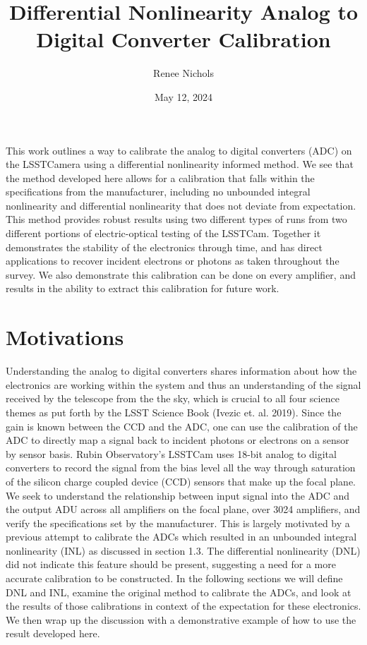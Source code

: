 \documentclass[11pt, letterpaper]{article}
\title{Differential Nonlinearity Analog to Digital Converter Calibration}
\author{Renee Nichols}
\date{May 12, 2024}
\begin{document}
\maketitle 

This work outlines a way to calibrate the analog to digital converters (ADC) on the LSSTCamera using a differential nonlinearity informed method. 
We see that the method developed here allows for a calibration that falls within the specifications from the manufacturer, including no unbounded integral nonlinearity and differential nonlinearity that does not deviate from expectation. 
This method provides robust results using two different types of runs from two different portions of electric-optical testing of the LSSTCam. 
Together it demonstrates the stability of the electronics through time, and has direct applications to recover incident electrons or photons as taken throughout the survey. 
We also demonstrate this calibration can be done on every amplifier, and results in the ability to extract this calibration for future work. 

\section{Motivations}
\indent

 
Understanding the analog to digital converters shares information about how the electronics are working within the system and thus an understanding of the signal received by the telescope from the the sky, which is crucial to all four science themes as put forth by the LSST Science Book (Ivezic et. al. 2019). 
Since the gain is known between the CCD and the ADC, one can use the calibration of the ADC to directly map a signal back to incident photons or electrons on a sensor by sensor basis.
Rubin Observatory’s LSSTCam uses 18-bit analog to digital converters to record the signal from the bias level all the way through saturation of the silicon charge coupled device (CCD) sensors that make up the focal plane. 
We seek to understand the relationship between input signal into the ADC and the output ADU across all amplifiers on the focal plane, over 3024 amplifiers, and verify the specifications set by the manufacturer. 
This is largely motivated by a previous attempt to calibrate the ADCs which resulted in an unbounded integral nonlinearity (INL) as discussed in section 1.3. 
The differential nonlinearity (DNL) did not indicate this feature should be present, suggesting a need for a more accurate calibration to be constructed. 
In the following sections we will define DNL and INL, examine the original method to calibrate the ADCs, and look at the results of those calibrations in context of the expectation for these electronics. 
We then wrap up the discussion with a demonstrative example of how to use the result developed here. 
\end{document}
